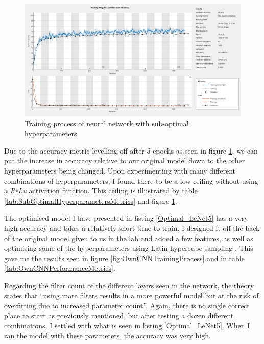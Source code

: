 \documentclass[11pt, letterpaper]{article}
\begin{document}
\begin{figure}[ht]
  \centering
  \includegraphics[width=1\linewidth]{Lab 5/HyperparameterOKresultTrainingProgress.png}
  \caption{Training process of neural network with sub-optimal hyperparameters}
  \label{fig:HyperparameterOKresultTrainingProgress}
\end{figure}

Due to the accuracy metric levelling off after 5 epochs as seen in figure \ref{fig:HyperparameterOKresultTrainingProgress}, we can put the increase in accuracy relative to our original model down to the other hyperparameters being changed. Upon experimenting with many different combinations of hyperparameters, I found there to be a low ceiling without using a \textit{ReLu} activation function. This ceiling is illustrated by table \ref{tab:SubOptimalHyperparametersMetrics} and figure \ref{fig:HyperparameterOKresultTrainingProgress}. 

The optimised model I have presented in listing \ref{Optimal_LeNet5} has a very high accuracy and takes a relatively short time to train. I designed it off the back of the original model given to us in the lab and added a few features, as well as optimising some of the hyperparameters using Latin hypercube sampling \cite{LHS}. This gave me the results seen in figure \ref{fig:OwnCNNTrainingProcess} and in table \ref{tab:OwnCNNPerformanceMetrics}.

Regarding the filter count of the different layers seen in the network, the theory \cite{DeepLearningCNN} states that ``using more filters results in a more powerful model but at the risk of overfitting due to increased parameter count''. Again, there is no single correct place to start as previously mentioned, but after testing a dozen different combinations, I settled with what is seen in listing \ref{Optimal_LeNet5}. When I ran the model with these parameters, the accuracy was very high.
\end{document}
